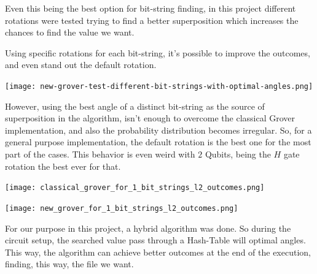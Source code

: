 \documentclass{article}
\begin{document}
Even this being the best option for bit-string finding, in this project different rotations were tested trying to find a better superposition which increases the chances to find the value we want.


\newpage

Using specific rotations for each bit-string, it's possible to improve the outcomes, and even stand out the default rotation.

\begin{center}
	\texttt{[image: new-grover-test-different-bit-strings-with-optimal-angles.png]}
	\label{fig:best-angles-diff-bit-strings-grover}
\end{center}

However, using the best angle of a distinct bit-string as the source of superposition in the algorithm, isn't enough to overcome the classical Grover implementation, and also the probability distribution becomes irregular. So, for a general purpose implementation, the default rotation is the best one for the most part of the cases. This behavior is even weird with $2$ Qubits, being the $H$ gate rotation the best ever for that.

\begin{center}
	\texttt{[image: classical\_grover\_for\_1\_bit\_strings\_l2\_outcomes.png]}
	\label{fig:l2-grover-classical-outcomes}
\end{center}

\newpage

\begin{center}
	\texttt{[image: new\_grover\_for\_1\_bit\_strings\_l2\_outcomes.png]}
	\label{fig:l2-grover-new-outcomes}
\end{center}

For our purpose in this project, a hybrid algorithm was done. So during the circuit setup, the searched value pass through a Hash-Table will optimal angles. This way, the algorithm can achieve better outcomes at the end of the execution, finding, this way, the file we want. 
\end{document}
